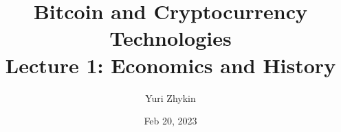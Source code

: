 \documentclass{beamer}
\title{
  Bitcoin and Cryptocurrency Technologies \\
  Lecture 1: Economics and History
}
\author{Yuri Zhykin}
\date{Feb 20, 2023}
\begin{document}
\frame{\titlepage}


\end{document}
